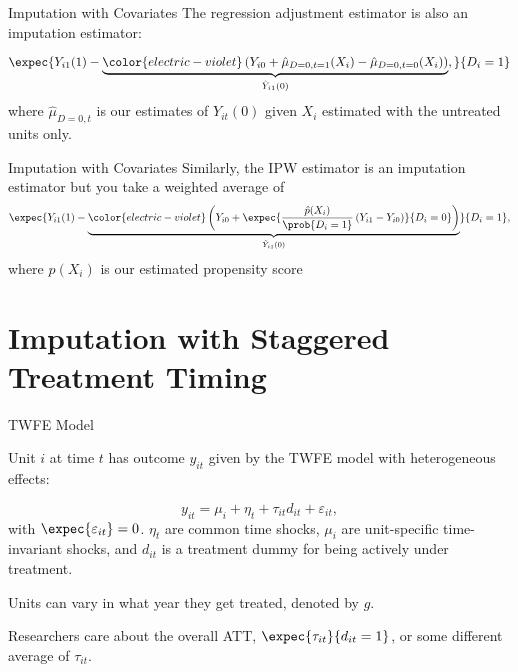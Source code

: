 \documentclass[t]{beamer}
\begin{document}
\begin{frame}{Imputation with Covariates}
  The regression adjustment estimator is also an imputation estimator:

  $$
  \expec{ 
    Y_{i1}(1) - \underbrace{\color{electric-violet}
      \left( Y_{i0} + \hat{\mu}_{D=0,t=1}(X_i) - \hat{\mu}_{D=0,t=0}(X_i) \right)
    }_{\hat{Y}_{i1}(0)},
  }{D_i = 1}
  $$
  \smallskip
  where $\hat{\mu}_{D=0, t}$ is our estimates of $Y_{it}(0)$ given $X_i$ estimated with the untreated units only.
\end{frame}

\begin{frame}{Imputation with Covariates}
  Similarly, the IPW estimator is an imputation estimator but you take a weighted average of 
  $$
    \expec{ 
      Y_{i1}(1) - \underbrace{\color{electric-violet}
        \left( 
          Y_{i0} + 
          \expec{\frac{\hat{p}(X_i)}{\prob{D_i = 1}} \left( Y_{i1} - Y_{i0} \right)}{D_i = 0}
        \right)
      }_{\hat{Y}_{i1}(0)} 
    }{D_i = 1},
  $$
  where $\hat{p}(X_i)$ is our estimated propensity score

\end{frame}

% 
% 
% 
% 






\section{Imputation with Staggered Treatment Timing}

\begin{frame}{TWFE Model}

  Unit $i$ at time $t$ has outcome $y_{it}$ given by the TWFE model with heterogeneous effects:

  $$
  y_{it} = \mu_i + \eta_t + \tau_{it} d_{it} + \varepsilon_{it},
  $$
  with $\expec{\varepsilon_{it}} = 0$. $\eta_t$ are common time shocks, $\mu_i$ are unit-specific time-invariant shocks, and $d_{it}$ is a treatment dummy for being actively under treatment. 
  

  \bigskip
  Units can vary in what year they get treated, denoted by $g$.  

  \bigskip
  Researchers care about the overall ATT, $\expec{\tau_{it}}{d_{it} = 1}$, or some different average of $\tau_{it}$. 
\end{frame}
\end{document}
